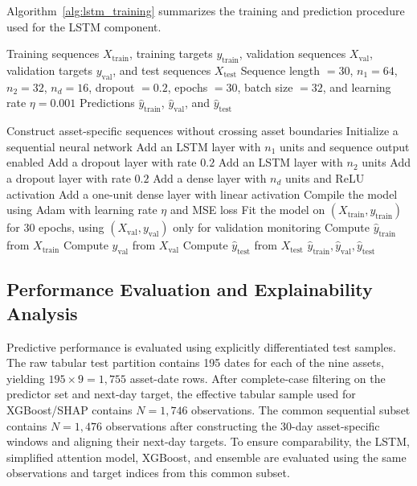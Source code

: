 \documentclass[utf8]{FrontiersinHarvard} %
\begin{document}
Algorithm~\ref{alg:lstm_training} summarizes the training and prediction procedure used for the LSTM component.

\begin{algorithm}[h]
	\caption{Training and prediction procedure for the LSTM component.}
	\label{alg:lstm_training}
	\begin{algorithmic}[1]
		\REQUIRE Training sequences \(X_{\mathrm{train}}\), training targets \(y_{\mathrm{train}}\), validation sequences \(X_{\mathrm{val}}\), validation targets \(y_{\mathrm{val}}\), and test sequences \(X_{\mathrm{test}}\)
		\REQUIRE Sequence length \(=30\), \(n_1=64\), \(n_2=32\), \(n_d=16\), dropout \(=0.2\), epochs \(=30\), batch size \(=32\), and learning rate \(\eta=0.001\)
		\ENSURE Predictions \(\hat{y}_{\mathrm{train}}\), \(\hat{y}_{\mathrm{val}}\), and \(\hat{y}_{\mathrm{test}}\)
		
		\STATE Construct asset-specific sequences without crossing asset boundaries
		\STATE Initialize a sequential neural network
		\STATE Add an LSTM layer with \(n_1\) units and sequence output enabled
		\STATE Add a dropout layer with rate \(0.2\)
		\STATE Add an LSTM layer with \(n_2\) units
		\STATE Add a dropout layer with rate \(0.2\)
		\STATE Add a dense layer with \(n_d\) units and ReLU activation
		\STATE Add a one-unit dense layer with linear activation
		\STATE Compile the model using Adam with learning rate \(\eta\) and MSE loss
		\STATE Fit the model on \((X_{\mathrm{train}},y_{\mathrm{train}})\) for 30 epochs, using \((X_{\mathrm{val}},y_{\mathrm{val}})\) only for validation monitoring
		\STATE Compute \(\hat{y}_{\mathrm{train}}\) from \(X_{\mathrm{train}}\)
		\STATE Compute \(\hat{y}_{\mathrm{val}}\) from \(X_{\mathrm{val}}\)
		\STATE Compute \(\hat{y}_{\mathrm{test}}\) from \(X_{\mathrm{test}}\)
		\RETURN \(\hat{y}_{\mathrm{train}},\hat{y}_{\mathrm{val}},\hat{y}_{\mathrm{test}}\)
	\end{algorithmic}
\end{algorithm}

\subsection{Performance Evaluation and Explainability Analysis}
\label{subsec:evaluation_explainability}

Predictive performance is evaluated using explicitly differentiated test samples. The raw tabular test partition contains 195 dates for each of the nine assets, yielding \(195\times9=1{,}755\) asset-date rows. After complete-case filtering on the predictor set and next-day target, the effective tabular sample used for XGBoost/SHAP contains \(N=1{,}746\) observations. The common sequential subset contains \(N=1{,}476\) observations after constructing the 30-day asset-specific windows and aligning their next-day targets. To ensure comparability, the LSTM, simplified attention model, XGBoost, and ensemble are evaluated using the same observations and target indices from this common subset.
\end{document}
